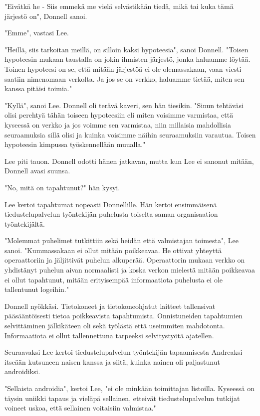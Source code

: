 "Eivätkä he - Siis emmekä me vielä selvästikään tiedä, mikä tai kuka tämä järjestö on", Donnell sanoi.


"Emme", vastasi Lee.


"Heillä, siis tarkoitan meillä, on silloin kaksi hypoteesia", sanoi Donnell. "Toisen hypoteesin mukaan taustalla on jokin ihmisten järjestö, jonka haluamme löytää. Toinen hypoteesi on se, että mitään järjestöä ei ole olemassakaan, vaan viesti saatiin nimenomaan verkolta. Ja jos se on verkko, haluamme tietää, miten sen kanssa pitäisi toimia."


"Kyllä", sanoi Lee. Donnell oli terävä kaveri, sen hän tiesikin. "Sinun tehtäväsi olisi perehtyä tähän toiseen hypoteesiin eli miten voisimme varmistaa, että kyseessä on verkko ja jos voimme sen varmistaa, niin millaisia mahdollisia seuraamuksia sillä olisi ja kuinka voisimme näihin seuraamuksiin varautua. Toisen hypoteesin kimpussa työskennellään muualla."


Lee piti tauon. Donnell odotti hänen jatkavan, mutta kun Lee ei sanonut mitään, Donnell avasi suunsa.


"No, mitä on tapahtunut?" hän kysyi.




\psep Lee kertoi tapahtumat nopeasti Donnellille. Hän kertoi ensimmäisenä tiedustelupalvelun työntekijän puhelusta toiselta saman organisaation työntekijältä.


"Molemmat puhelimet tutkittiin sekä heidän että valmistajan toimesta", Lee sanoi. "Kummassakaan ei ollut mitään poikkeavaa. He ottivat yhteyttä operaattoriin ja jäljittivät puhelun alkuperää. Operaattorin mukaan verkko on yhdistänyt puhelun aivan normaalisti ja koska verkon mielestä mitään poikkeavaa ei ollut tapahtunut, mitään erityisempää informaatiota puhelusta ei ole tallentunut logeihin."


Donnell nyökkäsi. Tietokoneet ja tietokoneohjatut laitteet tallensivat pääsääntöisesti tietoa poikkeavista tapahtumista. Onnistuneiden tapahtumien selvittäminen jälkikäteen oli sekä työlästä että useimmiten mahdotonta. Informaatiota ei ollut tallennettuna tarpeeksi selvitystyötä ajatellen.


Seuraavaksi Lee kertoi tiedustelupalvelun työntekijän tapaamisesta Andreaksi itseään kutsuneen naisen kanssa ja siitä, kuinka nainen oli paljastunut androidiksi.


"Sellaista androidia", kertoi Lee, "ei ole minkään toimittajan listoilla. Kyseessä on täysin uniikki tapaus ja vieläpä sellainen, etteivät tiedustelupalvelun tutkijat voineet uskoa, että sellainen voitaisiin valmistaa."


